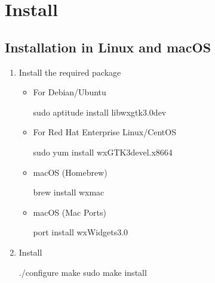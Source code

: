 \documentclass[letterpaper,10pt,pdftex,openany,english]{sphinxmanual}
\begin{document}
\chapter{Install}
\label{\detokenize{install:install}}\label{\detokenize{install::doc}}

\section{Installation in Linux and macOS}
\label{\detokenize{install:installation-in-linux-and-macos}}\begin{enumerate}
%
\item {} 
\sphinxAtStartPar
Install the required package
\begin{itemize}
\item {} 
\sphinxAtStartPar
For Debian/Ubuntu

\begin{sphinxVerbatim}[commandchars=\\\{\}]
\PYGZdl{} sudo aptitude install libwxgtk3.0\PYGZhy{}dev
\end{sphinxVerbatim}

\item {} 
\sphinxAtStartPar
For Red Hat Enterprise Linux/CentOS

\begin{sphinxVerbatim}[commandchars=\\\{\}]
\PYGZdl{} sudo yum install wxGTK3\PYGZhy{}devel.x86\PYGZus{}64
\end{sphinxVerbatim}

\item {} 
\sphinxAtStartPar
macOS (Homebrew)

\begin{sphinxVerbatim}[commandchars=\\\{\}]
\PYGZdl{} brew install wxmac
\end{sphinxVerbatim}

\item {} 
\sphinxAtStartPar
macOS (Mac Ports)

\begin{sphinxVerbatim}[commandchars=\\\{\}]
\PYGZdl{} port install wxWidgets\PYGZhy{}3.0
\end{sphinxVerbatim}

\end{itemize}

\item {} 
\sphinxAtStartPar
Install

\begin{sphinxVerbatim}[commandchars=\\\{\}]
\PYGZdl{} ./configure
\PYGZdl{} make
\PYGZdl{} sudo make install
\end{sphinxVerbatim}

\end{enumerate}
\end{document}
